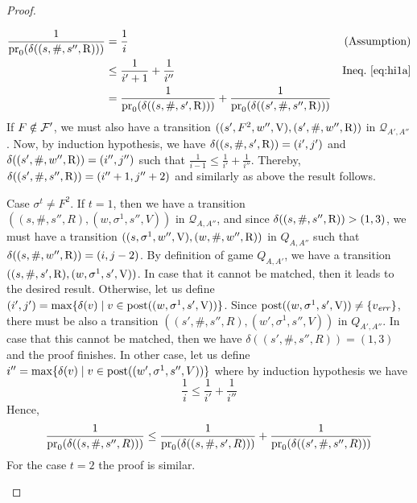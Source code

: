 \begin{proof}
\begin{description}
\begin{align*}
	\frac{1}{\operatorname{pr}_{0}(\delta((s,\#, s'', \mathrm{R})))} & = \frac{1}{i} & \text{(Assumption)} \\
									      & \leq \frac{1}{i'+1} + \frac{1}{i''} & \text{Ineq.~\ref{eq:hi1a}} \\
									      &  = \frac{1}{\operatorname{pr}_{0}(\delta((s, \#, s', \mathrm{R})))} +  \frac{1}{\operatorname{pr}_{0}(\delta((s', \#, s'', \mathrm{R})))} &
\end{align*}
	If $F \notin \mathcal{F}'$, we must also have a transition $((s', F^2, w'', \mathrm{V}), (s', \#, w'', \mathrm{R}))$ in $\mathcal{Q}_{A',A''}$. 
Now, by induction hypothesis, we have $\delta((s, \#, s', \mathrm{R})) = (i',j')$ and $\delta((s', \#, w'', \mathrm{R})) = (i'',j'')$ such that 
$\frac{1}{i-1} \leq \frac{1}{i'} + \frac{1}{i''}$. Thereby, $\delta((s', \#, s'', \mathrm{R})) = (i''+1, j''+2)$ and similarly as above the result follows.

	Case $\sigma^t \neq F^2$. If $t=1$, then we have a transition $((s, \#, s'', R), (w, \sigma^1, s'', V))$ in $\mathcal{Q}_{A,A''}$, and 
	since $\delta((s, \#, s'', \mathrm{R})) > (1,3)$,
we must have a transition $((s, \sigma^1, w'', \mathrm{V}), (w, \#, w'', \mathrm{R}))$ in $Q_{A,A''}$ such that $\delta((s, \#, w'', \mathrm{R})) = (i,j-2)$. 
By definition of game $Q_{A, A'}$, we have a transition
$((s, \#, s', \mathrm{R}), (w, \sigma^1, s', \mathrm{V}))$. In case that it cannot be matched, 
then it leads to the desired result. Otherwise, let us define $(i',j') = \max \{\delta(v) \mid v \in \operatorname{post}((w, \sigma^1, s', \mathrm{V})) \}$. 
Since $\operatorname{post}((w, \sigma^1, s', \mathrm{V})) \neq \{v_{\mathit{err}}\}$, there must be also a transition $((s', \#, s'', R), (w', \sigma^1, s'', V))$ in $Q_{A',A''}$. 
In case that this cannot be matched, then we have $\delta((s', \#, s'', R)) = (1,3)$ and the proof finishes. 
In other case, let us define $i'' = \max \{\delta(v) \mid v \in \operatorname{post}((w', \sigma^1, s'', V)) \}$ where by induction hypothesis we have
\begin{equation}
	\frac{1}{i} \leq \frac{1}{i'} + \frac{1}{i''}
\end{equation}	
	Hence, 
\begin{equation}
	\frac{1}{\operatorname{pr}_{0}(\delta((s, \#, s'', R)))} \leq \frac{1}{\operatorname{pr}_{0}(\delta((s, \#, s', R)))} + \frac{1}{\operatorname{pr}_{0}(\delta((s', \#, s'', R)))}
\end{equation}	
	For the case $t=2$ the proof is similar.
\end{description}


\qedhere
\end{proof}\\

